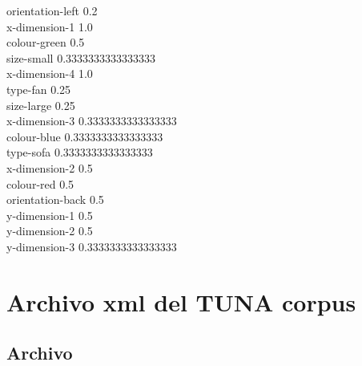 \label{probabilidad-GATT}

orientation-left	0.2\\
x-dimension-1	1.0\\
colour-green	0.5\\
size-small	0.3333333333333333\\
x-dimension-4	1.0\\
type-fan	0.25\\
size-large	0.25\\
x-dimension-3	0.3333333333333333\\
colour-blue	0.3333333333333333\\
type-sofa	0.3333333333333333\\
x-dimension-2	0.5\\
colour-red	0.5\\
orientation-back	0.5\\
y-dimension-1	0.5\\
y-dimension-2	0.5\\
y-dimension-3	0.3333333333333333\\




\chapter{Archivo xml del TUNA corpus}
\section{Archivo}
\label{archivos-xml-tuna}

